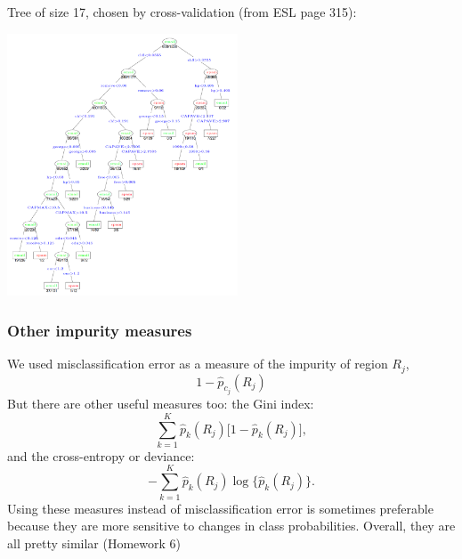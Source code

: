 \documentclass[mathserif]{beamer}
\def\red{\color[rgb]{0.8,0,0}}
\begin{document}
\begin{frame}
\frametitle{}
\bigskip
Tree of size 17, chosen by cross-validation (from ESL page 315):

\vspace{-5pt}
\begin{center}
\includegraphics[width=2.7in]{spamtree.png}
\end{center}
\end{frame}

\begin{frame}
\frametitle{Other impurity measures}
We used misclassification error as a measure of the impurity of region $R_j$,
$$1-\hat{p}_{c_j}(R_j)$$
But there are other useful measures too: the {\red Gini index}:
$$\sum_{k=1}^K \hat{p}_k(R_j) \big[1-\hat{p}_k(R_j)\big],$$
and the {\red cross-entropy} or {\red deviance}:
$$-\sum_{k=1}^K \hat{p}_k(R_j) \log\big\{\hat{p}_k(R_j) \big\}.$$
Using these measures instead of misclassification error is sometimes preferable 
because they are more sensitive to changes in class probabilities. Overall, 
they are all pretty similar (Homework 6)
\end{frame}
\end{document}
